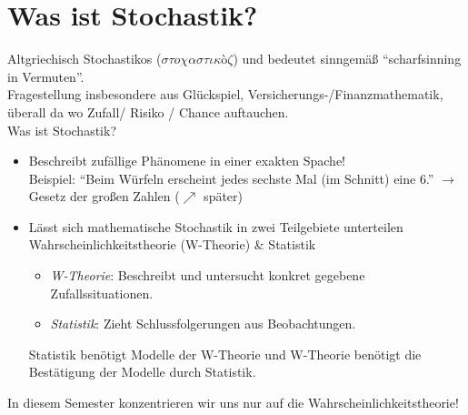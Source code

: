 \chapter*{Was ist Stochastik?}

Altgriechisch Stochastikos ($\sigma \tau o \chi \alpha \sigma \tau \iota \kappa$\`{o}$ \zeta$) und bedeutet sinngemäß ``scharfsinning in Vermuten''.\\
Fragestellung insbesondere aus Glückspiel, Versicherungs-/Finanzmathematik, überall da wo Zufall/ Risiko / Chance auftauchen.\\
Was ist Stochastik?
\begin{itemize}
	\item Beschreibt zufällige Phänomene in einer exakten Spache!\\
	Beispiel: ``Beim Würfeln erscheint jedes sechste Mal (im Schnitt) eine 6.'' $\longrightarrow$ Gesetz der großen Zahlen ($\nearrow$ später) %
	\item Lässt sich mathematische Stochastik in zwei Teilgebiete unterteilen\\
	Wahrscheinlichkeitstheorie (W-Theorie) \& Statistik
	\begin{itemize}
		\item \textit{W-Theorie}: Beschreibt und untersucht konkret gegebene Zufallssituationen.
		\item \textit{Statistik}: Zieht Schlussfolgerungen aus Beobachtungen.
	\end{itemize}
	Statistik benötigt Modelle der W-Theorie und W-Theorie benötigt die Bestätigung der Modelle durch Statistik.
\end{itemize}
In diesem Semester konzentrieren wir uns nur auf die Wahrscheinlichkeitstheorie!